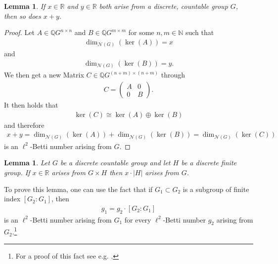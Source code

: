 \documentclass[12pt,a4paper]{scrartcl}
\theoremstyle{plain}
\newtheorem{Lemma}[Theorem]{Lemma}
\theoremstyle{definition}
\newcommand{\R}{\mathbb{R}} %
\newcommand{\Q}{\mathbb{Q}} %
\newcommand{\N}{\mathbb{N}} %
\newcommand{\2}{\mathbb{Z} / 2 \mathbb{Z}}
\newcommand{\1}{\bar{1}}
\newcommand{\0}{\bar{0}}
\begin{document}
\begin{Lemma}\label{add}
	If $x \in \R$ and $y \in \R$ both arise from a discrete, countable group $G$, then so does $x + y$.
\end{Lemma}
\begin{proof}
	Let $A \in \Q G^{n \times n}$ and $B \in \Q G^{m \times m}$ for some $n, m \in \N$ such that 
	\begin{align*}
		\dim_{\mathcal{N}(G)}(\ker (A))=x
	\end{align*}
	and
	\begin{align*}
		\dim_{\mathcal{N}(G)}(\ker (B))=y.
	\end{align*}
	We then get a new Matrix $C \in \Q G^{(n+m) \times (n+m)}$ through
	\begin{align*}
		C = \begin{pmatrix}
		A & 0 \\
		0 & B
		\end{pmatrix}.
	\end{align*}
	It then holds that
	\begin{align*}
		\ker(C) \cong \ker(A) \oplus \ker (B)
	\end{align*}
	and therefore
	\begin{align*}
		x + y = \dim_{\mathcal{N}(G)}(\ker (A))+\dim_{\mathcal{N}(G)}(\ker (B)) = \dim_{\mathcal{N}(G)}(\ker (C))
	\end{align*}
	is an $\ell^2$-Betti number arising from $G$.
\end{proof}
\begin{Lemma}\label{mult}
	Let $G$ be a discrete countable group and let $H$ be a discrete finite group. If $x \in \R$ arises from $G \times H$ then $x \cdot |H|$ arises from $G$.
\end{Lemma}
To prove this lemma, one can use the fact that if $G_1 \subset G_2$ is a subgroup of finite index $[G_2 : G_1]$, then
\begin{align*}
	g_1 = g_2 \cdot [G_2 : G_1]
\end{align*}
is an $\ell^2$-Betti number arising from $G_1$ for every $\ell^2$-Betti number $g_2$ arising from $G_2$.\footnote{For a proof of this fact see e.g. \cite[p.38]{LUECK}.}
\end{document}
